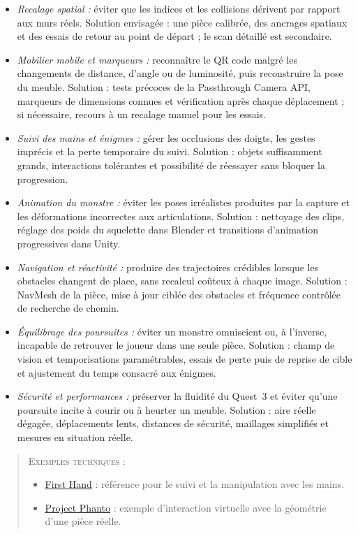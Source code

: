 \documentclass[11pt,a4paper]{article}
\newcommand{\doclink}[2]{\href{#1}{\textcolor{linkBlue}{\underline{#2}}}}
\begin{document}
\begin{itemize}
    \item \emph{Recalage spatial :} éviter que les indices et les collisions dérivent par rapport aux murs réels. Solution envisagée : une pièce calibrée, des ancrages spatiaux et des essais de retour au point de départ ; le scan détaillé est secondaire.
    \item \emph{Mobilier mobile et marqueurs :} reconnaître le QR code malgré les changements de distance, d'angle ou de luminosité, puis reconstruire la pose du meuble. Solution : tests précoces de la Passthrough Camera API, marqueurs de dimensions connues et vérification après chaque déplacement ; si nécessaire, recours à un recalage manuel pour les essais.
    \item \emph{Suivi des mains et énigmes :} gérer les occlusions des doigts, les gestes imprécis et la perte temporaire du suivi. Solution : objets suffisamment grands, interactions tolérantes et possibilité de réessayer sans bloquer la progression.
    \item \emph{Animation du monstre :} éviter les poses irréalistes produites par la capture et les déformations incorrectes aux articulations. Solution : nettoyage des clips, réglage des poids du squelette dans Blender et transitions d'animation progressives dans Unity.
    \item \emph{Navigation et réactivité :} produire des trajectoires crédibles lorsque les obstacles changent de place, sans recalcul coûteux à chaque image. Solution : NavMesh de la pièce, mise à jour ciblée des obstacles et fréquence contrôlée de recherche de chemin.
    \item \emph{Équilibrage des poursuites :} éviter un monstre omniscient ou, à l'inverse, incapable de retrouver le joueur dans une seule pièce. Solution : champ de vision et temporisations paramétrables, essais de perte puis de reprise de cible et ajustement du temps consacré aux énigmes.
    \item \emph{Sécurité et performances :} préserver la fluidité du Quest~3 et éviter qu'une poursuite incite à courir ou à heurter un meuble. Solution : aire réelle dégagée, déplacements lents, distances de sécurité, maillages simplifiés et mesures en situation réelle.
\end{itemize}

\begin{quote}
    \small
    \noindent\textsc{Exemples techniques :}
    \begin{itemize}[leftmargin=1.5em,itemsep=0.28em,topsep=0.35em]
        \item \doclink{https://github.com/oculus-samples/Unity-FirstHand}{First Hand} : référence pour le suivi et la manipulation avec les mains.
        \item \doclink{https://github.com/oculus-samples/Unity-Phanto}{Project Phanto} : exemple d'interaction virtuelle avec la géométrie d'une pièce réelle.
    \end{itemize}
\end{quote}
\end{document}
